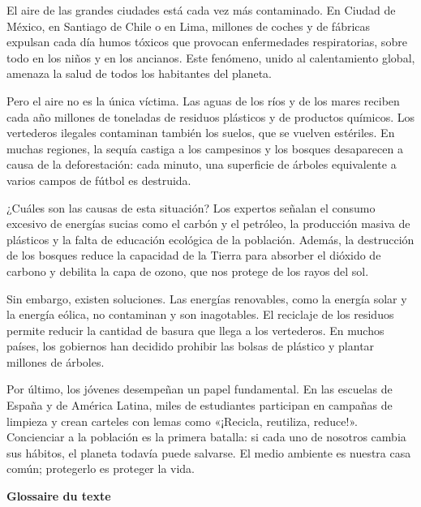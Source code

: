 \documentclass[11pt]{article}
\begin{document}
\begin{textebox}
El aire de las grandes ciudades está cada vez más contaminado. En Ciudad de México, en Santiago de Chile o en Lima, millones de coches y de fábricas expulsan cada día humos tóxicos que provocan enfermedades respiratorias, sobre todo en los niños y en los ancianos. Este fenómeno, unido al calentamiento global, amenaza la salud de todos los habitantes del planeta.

Pero el aire no es la única víctima. Las aguas de los ríos y de los mares reciben cada año millones de toneladas de residuos plásticos y de productos químicos. Los vertederos ilegales contaminan también los suelos, que se vuelven estériles. En muchas regiones, la sequía castiga a los campesinos y los bosques desaparecen a causa de la deforestación: cada minuto, una superficie de árboles equivalente a varios campos de fútbol es destruida.

¿Cuáles son las causas de esta situación? Los expertos señalan el consumo excesivo de energías sucias como el carbón y el petróleo, la producción masiva de plásticos y la falta de educación ecológica de la población. Además, la destrucción de los bosques reduce la capacidad de la Tierra para absorber el dióxido de carbono y debilita la capa de ozono, que nos protege de los rayos del sol.

Sin embargo, existen soluciones. Las energías renovables, como la energía solar y la energía eólica, no contaminan y son inagotables. El reciclaje de los residuos permite reducir la cantidad de basura que llega a los vertederos. En muchos países, los gobiernos han decidido prohibir las bolsas de plástico y plantar millones de árboles.

Por último, los jóvenes desempeñan un papel fundamental. En las escuelas de España y de América Latina, miles de estudiantes participan en campañas de limpieza y crean carteles con lemas como «¡Recicla, reutiliza, reduce!». Concienciar a la población es la primera batalla: si cada uno de nosotros cambia sus hábitos, el planeta todavía puede salvarse. El medio ambiente es nuestra casa común; protegerlo es proteger la vida.
\end{textebox}

\textbf{Glossaire du texte}
\end{document}
